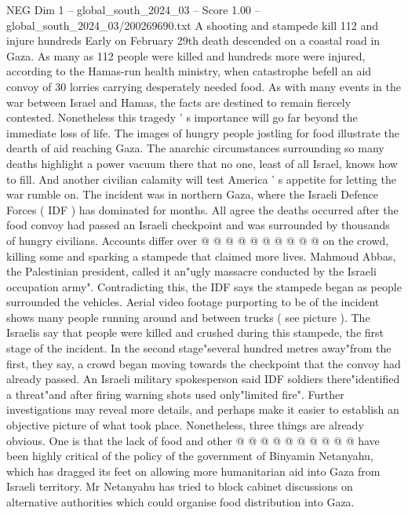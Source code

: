 \begin{textsample}{NEG Dim 1 – global\_south\_2024\_03 – Score 1.00 – global\_south\_2024\_03/200269690.txt}  \label{ex:f1_neg_109}
A shooting and stampede kill 112 and injure hundreds Early on February 29th death descended on a coastal road in Gaza.
As many as 112 people were killed and hundreds more were injured, according to the Hamas-run health ministry, when catastrophe befell an aid convoy of 30 lorries carrying desperately needed food.
As with many events in the war between Israel and Hamas, the facts are destined to remain fiercely contested.
Nonetheless this tragedy ' s importance will go far beyond the immediate loss of life.
The images of hungry people jostling for food illustrate the dearth of aid reaching Gaza.
The anarchic circumstances surrounding so many deaths highlight a power vacuum there that no one, least of all Israel, knows how to fill.
And another civilian calamity will test America ' s appetite for letting the war rumble on.
The incident was in northern Gaza, where the Israeli Defence Forces ( IDF ) has dominated for months.
All agree the deaths occurred after the food convoy had passed an Israeli checkpoint and was surrounded by thousands of hungry civilians.
Accounts differ over @ @ @ @ @ @ @ @ @ @ on the crowd, killing some and sparking a stampede that claimed more lives.
Mahmoud Abbas, the Palestinian president, called it an"ugly massacre conducted by the Israeli occupation army".
Contradicting this, the IDF says the stampede began as people surrounded the vehicles.
Aerial video footage purporting to be of the incident shows many people running around and between trucks ( see picture ).
The Israelis say that people were killed and crushed during this stampede, the first stage of the incident.
In the second stage"several hundred metres away"from the first, they say, a crowd began moving towards the checkpoint that the convoy had already passed.
An Israeli military spokesperson said IDF soldiers there"identified a threat"and after firing warning shots used only"limited fire".
Further investigations may reveal more details, and perhaps make it easier to establish an objective picture of what took place.
Nonetheless, three things are already obvious.
One is that the lack of food and other @ @ @ @ @ @ @ @ @ @ have been highly critical of the policy of the government of Binyamin Netanyahu, which has dragged its feet on allowing more humanitarian aid into Gaza from Israeli territory.
Mr Netanyahu has tried to block cabinet discussions on alternative authorities which could organise food distribution into Gaza.

\end{textsample}
